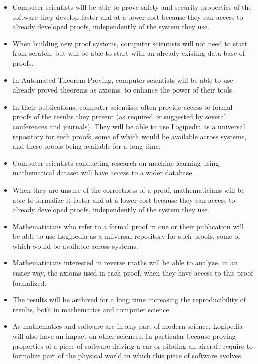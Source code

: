 \begin{itemize}

\item Computer scientists will be able to prove safety and security
  properties of the software they develop faster and at a lower cost
  because they can access to already developed proofs, independently
  of the system they use.

\item When building new proof systems, computer scientists will not
  need to start from scratch, but will be able to start with an already
  existing data base of proofs.

\item In Automated Theorem Proving, computer scientists will be able
  to use already proved theorems as axioms, to enhance the power of
  their tools.

\item In their publications, computer scientists often provide access
  to formal proofs of the results they present (as required or
  suggested by several conferences and journals). They will be able to
  use {\sf Logipedia} as a universal repository for such proofs, some of
  which would be available across systems, and these proofs being
  available for a long time.

\item Computer scientists conducting research on machine learning
  using mathematical dataset will have access to a wider database.

\item When they are unsure of the correctness of a proof,
  mathematicians will be able to formalize it faster and at a lower
  cost because they can access to already developed proofs,
  independently of the system they use.

\item Mathematicians who refer to a formal proof in one or their
  publication will be able to use {\sf Logipedia} as a universal
  repository for such proofs, some of which would be available across
  systems.

\item Mathematicians interested in reverse maths will be able to
  analyze, in an easier way, the axioms used in each proof, when they
  have access to this proof formalized.

\item The results will be archived for a long time increasing the
  reproducibility of results, both in mathematics and computer science.

\item As mathematics and software are in any part of modern science,
  {\sf Logipedia} will also have an impact on other sciences. In
  particular because proving properties of a piece of software driving
  a car or piloting an aircraft require to formalize part of the
  physical world in which this piece of software evolves.
\end{itemize}
  
